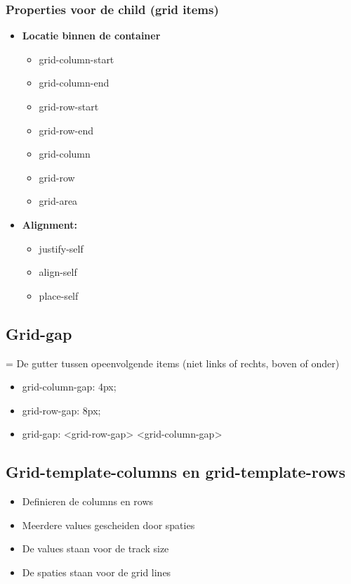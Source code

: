 \documentclass{article}
\newcommand{\bold}[1]{\textbf{#1}}
\begin{document}
\subsubsection{Properties voor de child (grid items)}

\begin{itemize}
    \item \bold{Locatie binnen de container}
    \begin{itemize}
        \item grid-column-start
        \item grid-column-end
        \item grid-row-start
        \item grid-row-end
        \item grid-column
        \item grid-row
        \item grid-area
    \end{itemize}
    \item \bold{Alignment:}
    \begin{itemize}
        \item justify-self
        \item align-self
        \item place-self
    \end{itemize}
\end{itemize}

\subsection{Grid-gap}
= De gutter tussen opeenvolgende items (niet links of rechts, boven of onder)

\begin{itemize}
    \item grid-column-gap: 4px;
    \item grid-row-gap: 8px; 
    \item grid-gap: <grid-row-gap> <grid-column-gap>
\end{itemize}

\subsection{Grid-template-columns en grid-template-rows}

\begin{itemize}
    \item Definieren de columns en rows
    \item Meerdere values gescheiden door spaties
    \item De values staan voor de track size
    \item De spaties staan voor de grid lines
\end{itemize}
\end{document}
